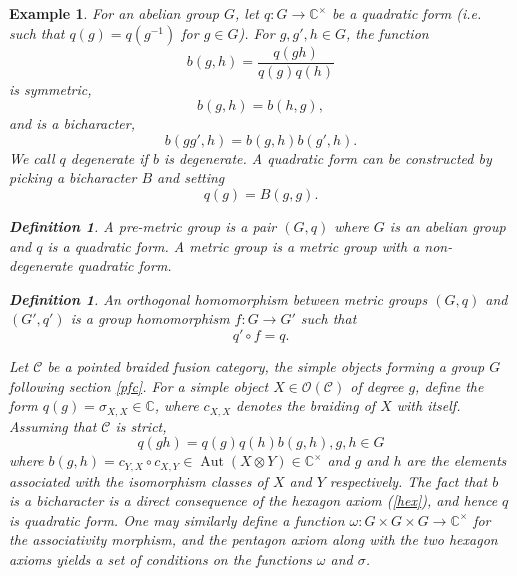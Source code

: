 \documentclass[11pt]{book}
\theoremstyle{Rem}
\newtheorem{Expl}[theorem]{Example}
\theoremstyle{definition}
\newtheorem{Def}[theorem]{Definition}
\numberwithin{equation}{section}
\newcommand\inv{^{-1}}
\newcommand\ot{\otimes}
\newcommand\Aut{\operatorname{Aut}}
\newcommand\kk{\mathbb C}
\newcommand\C{\mathcal C}
\newcommand\OO{\mathcal O}
\newcommand{\ra}\rightarrow
\begin{document}
\begin{Expl}\rm
For an abelian group $G$, let $q:G\rightarrow \kk^\times$ be a \textit{quadratic form} (i.e. such that $q(g)= q(g\inv)$ for $g\in G$). For $g, g', h \in G$, the function \begin{equation}
	b(g, h) = \frac{q(gh)}{q(g)q(h)}
\end{equation} is symmetric, \begin{equation}
	b(g, h) = b(h, g),
\end{equation} and is a bicharacter, \begin{equation}
	b(gg', h) = b(g, h) b(g', h).
\end{equation}
We call $q$ \textit{degenerate} if $b$ is degenerate. A quadratic form can be constructed by picking a bicharacter $B$ and setting \begin{equation}
	q(g) = B(g,g).
\end{equation}
\begin{Def}
A \textit{pre-metric group} is a pair $(G, q)$ where $G$ is an abelian group and $q$ is a quadratic form. A \textit{metric group} is a metric group with a non-degenerate quadratic form.	
\end{Def}
\begin{Def}
An \textit{orthogonal homomorphism} between metric groups $(G, q)$ and $(G', q')$ is a group homomorphism $f:G\rightarrow G'$ such that \begin{equation}
	q'\circ f = q.
\end{equation}
\end{Def}
Let $\C$ be a pointed braided fusion category, the simple objects forming a group $G$ following section \ref{pfc}. For a simple object $X\in \OO(\C)$ of degree $g$, define the form $q(g) = \sigma_{X, X} \in \kk$, where $c_{X, X}$ denotes the braiding of $X$ with itself. Assuming that $\C$ is strict, \begin{equation}
	q(gh) = q(g)q(h)b(g,h), g, h\in G
\end{equation}
where $b(g, h)  = c_{Y, X} \circ c_{X, Y}\in \Aut(X\ot Y) \in \kk^\times$ and $g$ and $h$ are the elements associated with the isomorphism classes of $X$ and $Y$ respectively. The fact that $b$ is a bicharacter is a direct consequence of the hexagon axiom (\ref{hex}), and hence $q$ is quadratic form.
One may similarly define a function $\omega: G\times G \times G \ra \kk^\times$ for the associativity morphism, and the pentagon axiom along with the two hexagon axioms yields a set of conditions on the functions $\omega$ and $\sigma$.
\begin{align*}

\end{align*}
\end{Expl}
\end{document}
